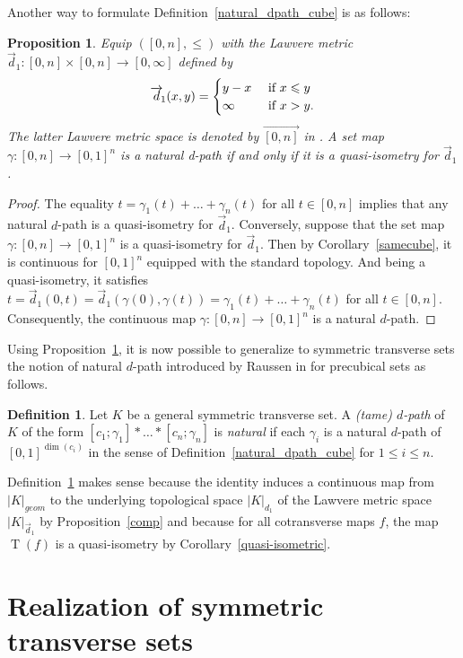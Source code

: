 \documentclass[a4paper,12pt]{amsart}
\newcommand{\p}{\times}
\renewcommand{\vec}{\overrightarrow}
\newtheorem{prop}[thm]{Proposition}
\newcommand{\bp}{\begin{prop}}
\newcommand{\ep}{\end{prop}}
\newcommand{\bpf}{\begin{proof}}
\newcommand{\epf}{\end{proof}}
\theoremstyle{definition}
\newtheorem{defn}[thm]{Definition}
\newcommand{\bd}{\begin{defn}}
\newcommand{\ed}{\end{defn}}
\renewcommand{\leq}{\leqslant}
\newcommand{\vd}{\vec{d}\!_1}
\DeclareMathOperator{\TT}{T}
\begin{document}
Another way to formulate Definition~\ref{natural_dpath_cube} is as follows: 

\bp \label{natural-metric} Equip $([0,n],\leq)$ with the Lawvere metric $\vd:[0,n]\p [0,n]\to [0,\infty]$ defined by 
\[
\vd(x,y) = \begin{cases}
	y-x & \hbox{ if }x\leq y\\
	\infty & \hbox{ if }x> y.
\end{cases}
\]
The latter Lawvere metric space is denoted by $\vec{[0,n]}$ in \cite[Example~3.2]{zbMATH07226006}. A set map $\gamma:[0,n]\to [0,1]^n$ is a natural d-path if and only if it is a quasi-isometry for $\vd$. 
\ep

\bpf
The equality $t=\gamma_1(t)+\dots +\gamma_n(t)$ for all $t\in [0,n]$ implies that any natural $d$-path is a quasi-isometry for $\vd$. Conversely, suppose that the set map $\gamma:[0,n]\to [0,1]^n$ is a quasi-isometry for $\vd$. Then by Corollary~\ref{samecube}, it is continuous for $[0,1]^n$ equipped with the standard topology. And being a quasi-isometry, it satisfies $t=\vd(0,t) = \vd(\gamma(0),\gamma(t))=\gamma_1(t)+\dots +\gamma_n(t)$ for all $t\in [0,n]$. Consequently, the continuous map $\gamma:[0,n]\to [0,1]^n$ is a natural $d$-path.
\epf

Using Proposition~\ref{natural-metric}, it is now possible to generalize to symmetric transverse sets the notion of natural $d$-path introduced by Raussen in \cite[Definition~2.14]{MR2521708} for precubical sets as follows. 

\bd \label{dpath-natural}
Let $K$ be a general symmetric transverse set. A \textit{(tame) $d$-path} of $K$ of the form $[c_1;\gamma_1] * \dots *[c_n;\gamma_n]$ is \textit{natural} if each $\gamma_i$ is a natural $d$-path of $[0,1]^{\dim(c_i)}$ in the sense of Definition~\ref{natural_dpath_cube} for $1\leq i \leq n$.
\ed 

Definition~\ref{dpath-natural} makes sense because the identity induces a continuous map from $|K|_{geom}$ to the underlying topological space $|K|_{d_1}$ of the Lawvere metric space $|K|_{\vd}$ by Proposition~\ref{comp} and because for all cotransverse maps $f$, the map $\TT(f)$ is a quasi-isometry by Corollary~\ref{quasi-isometric}.

\part{Realization of symmetric transverse sets}
\label{homotopical}

\end{document}
